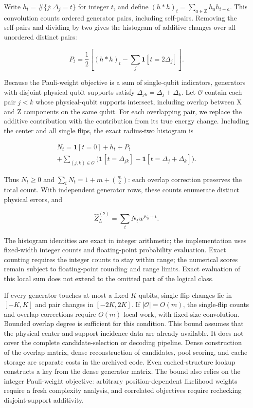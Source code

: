 \documentclass[aps,prapplied,reprint,superscriptaddress,amsmath,amssymb,floatfix,nofootinbib]{revtex4-2}
\begin{document}
Write \(h_t=\#\{j:\Delta_j=t\}\) for integer \(t\), and define
\((h*h)_t=\sum_{a\in\mathbb Z}h_a h_{t-a}\). This convolution counts
ordered generator pairs, including self-pairs. Removing the self-pairs
and dividing by two gives the histogram of additive changes over all
unordered distinct pairs:

\[
P_t=\frac12\left[(h*h)_t-\sum_j\mathbf1[t=2\Delta_j]\right].
\tag{A1}\label{eq:A1}
\]

Because the Pauli-weight objective is a sum of single-qubit indicators,
generators with disjoint physical-qubit supports satisfy
\(\Delta_{jk}=\Delta_j+\Delta_k\). Let \(\mathcal O\) contain each pair
\(j<k\) whose physical-qubit supports intersect, including overlap
between X and Z components on the same qubit. For each overlapping pair,
we replace the additive contribution with the contribution from its true
energy change. Including the center and all single flips, the exact
radius-two histogram is

\[
\begin{gathered}
N_t=\mathbf1[t=0]+h_t+P_t
\\+\sum_{(j,k)\in\mathcal O}
\bigl(\mathbf1[t=\Delta_{jk}]-\mathbf1[t=\Delta_j+\Delta_k]\bigr).
\end{gathered}
\tag{A2}\label{eq:A2}
\]

Thus \(N_t\ge0\) and \(\sum_tN_t=1+m+\binom m2\): each overlap
correction preserves the total count. With independent generator rows,
these counts enumerate distinct physical errors, and

\[
\widehat Z_L^{(2)}=\sum_tN_t w^{E_0+t}.
\]

The histogram identities are exact in integer arithmetic; the
implementation uses fixed-width integer counts and floating-point
probability evaluation. Exact counting requires the integer counts to
stay within range; the numerical scores remain subject to floating-point
rounding and range limits. Exact evaluation of this local sum does not
extend to the omitted part of the logical class.

If every generator touches at most a fixed \(K\) qubits, single-flip
changes lie in \([-K,K]\) and pair changes in \([-2K,2K]\). If
\(|\mathcal O|=O(m)\), the single-flip counts and overlap corrections
require \(O(m)\) local work, with fixed-size convolution. Bounded
overlap degree is sufficient for this condition. This bound assumes that
the physical center and support incidence data are already available. It
does not cover the complete candidate-selection or decoding pipeline.
Dense construction of the overlap matrix, dense reconstruction of
candidates, pool scoring, and cache storage are separate costs in the
archived code. Even cached-structure lookup constructs a key from the
dense generator matrix. The bound also relies on the integer
Pauli-weight objective: arbitrary position-dependent likelihood weights
require a fresh complexity analysis, and correlated objectives require
rechecking disjoint-support additivity.
\end{document}
